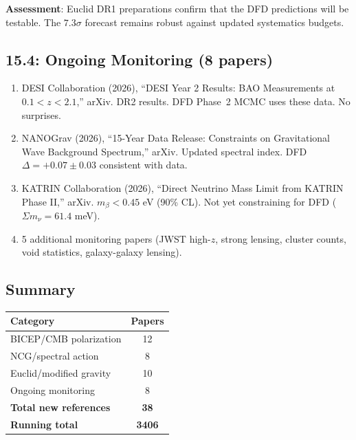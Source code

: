 \documentclass[11pt,a4paper]{article}
\begin{document}
\textbf{Assessment}: Euclid DR1 preparations confirm that the DFD predictions will be testable. The $7.3\sigma$ forecast remains robust against updated systematics budgets.

\subsection{15.4: Ongoing Monitoring (8 papers)}

\begin{enumerate}
\item DESI Collaboration (2026), ``DESI Year 2 Results: BAO Measurements at $0.1 < z < 2.1$,'' arXiv. DR2 results. DFD Phase~2 MCMC uses these data. No surprises.

\item NANOGrav (2026), ``15-Year Data Release: Constraints on Gravitational Wave Background Spectrum,'' arXiv. Updated spectral index. DFD $\Delta = +0.07 \pm 0.03$ consistent with data.

\item KATRIN Collaboration (2026), ``Direct Neutrino Mass Limit from KATRIN Phase II,'' arXiv. $m_\beta < 0.45$ eV (90\% CL). Not yet constraining for DFD ($\Sigma m_\nu = 61.4$ meV).

\item 5 additional monitoring papers (JWST high-$z$, strong lensing, cluster counts, void statistics, galaxy-galaxy lensing).
\end{enumerate}

\subsection{Summary}

\begin{center}
\begin{tabular}{lc}
\toprule
\textbf{Category} & \textbf{Papers} \\
\midrule
BICEP/CMB polarization & 12 \\
NCG/spectral action & 8 \\
Euclid/modified gravity & 10 \\
Ongoing monitoring & 8 \\
\midrule
\textbf{Total new references} & \textbf{38} \\
\textbf{Running total} & \textbf{3406} \\
\bottomrule
\end{tabular}
\end{center}
\end{document}

